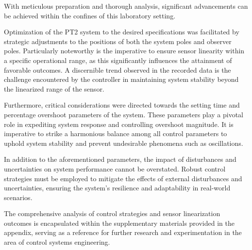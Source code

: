 
With meticulous preparation and thorough analysis, significant advancements can be achieved within the confines of this laboratory setting.

Optimization of the PT2 system to the desired specifications was facilitated by strategic adjustments to the positions of both the system poles and observer poles. Particularly noteworthy is the imperative to ensure sensor linearity within a specific operational range, as this significantly influences the attainment of favorable outcomes. A discernible trend observed in the recorded data is the challenge encountered by the controller in maintaining system stability beyond the linearized range of the sensor.

Furthermore, critical considerations were directed towards the setting time and percentage overshoot parameters of the system. These parameters play a pivotal role in expediting system response and controlling overshoot magnitude. It is imperative to strike a harmonious balance among all control parameters to uphold system stability and prevent undesirable phenomena such as oscillations.

In addition to the aforementioned parameters, the impact of disturbances and uncertainties on system performance cannot be overstated. Robust control strategies must be employed to mitigate the effects of external disturbances and uncertainties, ensuring the system's resilience and adaptability in real-world scenarios.

The comprehensive analysis of control strategies and sensor linearization outcomes is encapsulated within the supplementary materials provided in the appendix, serving as a reference for further research and experimentation in the area of control systems engineering.


